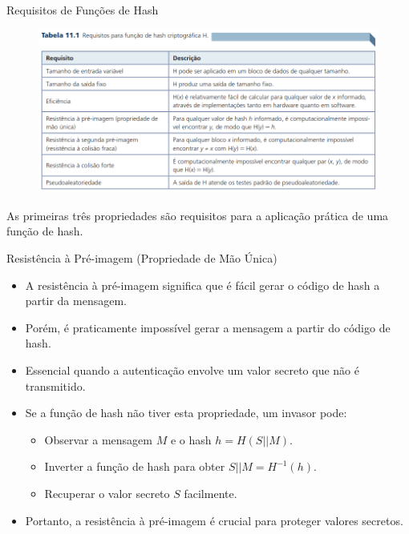 \begin{frame}{Requisitos de Funções de Hash}

    \begin{figure}
        \centering
        \includegraphics[width=0.9\linewidth]{Figuras/requisitos-funcao-hash.png}

    \end{figure}
    As primeiras três
    propriedades são requisitos para a aplicação prática de uma função de hash.
\end{frame}

\begin{frame}{Resistência à Pré-imagem (Propriedade de Mão Única)}
    \begin{itemize}
        \item A resistência à pré-imagem significa que é fácil gerar o código de hash a partir da mensagem.
        \item Porém, é praticamente impossível gerar a mensagem a partir do código de hash.
        \item Essencial quando a autenticação envolve um valor secreto que não é transmitido.
        \item Se a função de hash não tiver esta propriedade, um invasor pode:
              \begin{itemize}
                  \item Observar a mensagem $M$ e o hash $h = H(S || M)$.
                  \item Inverter a função de hash para obter $S || M = H^{-1}(h)$.
                  \item Recuperar o valor secreto $S$ facilmente.
              \end{itemize}
        \item Portanto, a resistência à pré-imagem é crucial para proteger valores secretos.
    \end{itemize}
\end{frame}

